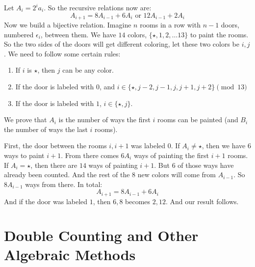 	
	\begin{solution}
		Let $ A_i=2^ia_i $. So the recursive relations now are:
			\[A_{i+1}=8A_{i-1}+6A_i \text{ or } 12A_{i-1}+2A_i\]
		Now we build a bijective relation. Imagine $ n $ rooms in a row with $ n-1 $ doors, numbered $ \epsilon_i $, between them. We have $ 14 $ colors, $ \{\star, 1, 2, \dots 13\} $ to paint the rooms. So the two sides of the doors will get different coloring, let these two colors be $ i, j $. We need to follow some certain rules:
			\begin{enumerate}
				\itemsep-.4em
				\item If $ i $ is $ \star $, then $ j $ can be any color.
				\item If the door is labeled with $ 0 $, and $ i \in \{\star, j-2, j-1, j, j+1, j+2\} \pmod {13} $
				\item If the door is labeled with $ 1 $, $ i \in \{\star, j\} $.
			\end{enumerate}
		We prove that $ A_i $ is the number of ways the first $ i $ rooms can be painted (and $ B_i $ the number of ways the last $ i $ rooms).
		
		First, the door between the rooms $ i, i+1 $ was labeled $ 0 $. If $ A_i\ne \star $, then we have $ 6 $ ways to paint $ i+1 $. From there comes $ 6A_i $ ways of painting the first $ i+1 $ rooms. If $ A_i=\star $, then there are $ 14 $ ways of painting $ i+1 $. But $ 6 $ of those ways have already been counted. And the rest of the $ 8 $ new colors will come from $ A_{i-1} $. So $ 8A_{i-1} $ ways from there. In total:
			\[A_{i+1} = 8A_{i-1}+6A_i\]
		And if the door was labeled $ 1 $, then $ 6, 8 $ becomes $ 2, 12 $. And our result follows.
	\end{solution}

	
	
	
	

\newpage\section{Double Counting and Other Algebraic Methods}

